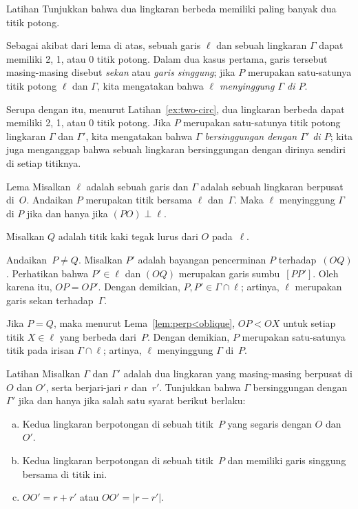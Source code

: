 \begin{thm}[!]{Latihan}\label{ex:two-circ}
Tunjukkan bahwa dua lingkaran berbeda memiliki paling banyak dua titik potong.
\end{thm}

Sebagai akibat dari lema di atas,
sebuah garis $\ell$ dan sebuah lingkaran $\Gamma$ dapat memiliki 2, 1, atau 0 titik potong.
Dalam dua kasus pertama, garis tersebut masing-masing disebut \emph{sekan} atau \emph{garis singgung};
jika $P$ merupakan satu-satunya titik potong $\ell$ dan $\Gamma$,
kita mengatakan bahwa \textit{$\ell$ menyinggung $\Gamma$ di $P$}.

Serupa dengan itu, menurut Latihan~\ref{ex:two-circ},
dua lingkaran berbeda dapat memiliki 2, 1, atau 0 titik potong.
Jika $P$ merupakan satu-satunya titik potong lingkaran $\Gamma$ dan $\Gamma'$,
kita mengatakan bahwa \emph{$\Gamma$ bersinggungan dengan $\Gamma'$ di $P$}; kita juga menganggap bahwa sebuah lingkaran bersinggungan dengan dirinya sendiri di setiap titiknya.

\begin{thm}[\abs]{Lema}\label{lem:tangent}
Misalkan $\ell$ adalah sebuah garis dan $\Gamma$ adalah sebuah lingkaran berpusat di~$O$.
Andaikan $P$ merupakan titik bersama $\ell$ dan~$\Gamma$.
Maka $\ell$ menyinggung $\Gamma$ di $P$ jika dan hanya jika $(PO)\perp \ell$.
\end{thm}

Misalkan $Q$ adalah titik kaki tegak lurus dari $O$ pada~$\ell$.

Andaikan~$P\ne Q$.
Misalkan $P'$ adalah bayangan pencerminan $P$ terhadap~$(OQ)$.
Perhatikan bahwa $P'\in\ell$ dan $(OQ)$ merupakan garis sumbu~$[PP']$.
Oleh karena itu, $OP=OP'$.
Dengan demikian, $P,P'\in \Gamma\cap \ell$;
artinya, $\ell$ merupakan garis sekan terhadap~$\Gamma$.

Jika $P=Q$,
maka menurut Lema~\ref{lem:perp<oblique},
$OP<OX$ untuk setiap titik $X\in \ell$ yang berbeda dari~$P$.
Dengan demikian, $P$ merupakan satu-satunya titik pada irisan $\Gamma\cap\ell$;
artinya, $\ell$ menyinggung $\Gamma$ di~$P$.
\qeds

\begin{thm}{Latihan}\label{ex:tangent-circles}
Misalkan $\Gamma$ dan $\Gamma'$ adalah dua lingkaran yang masing-masing berpusat di $O$ dan $O'$, serta berjari-jari $r$ dan~$r'$.
Tunjukkan bahwa $\Gamma$ bersinggungan dengan $\Gamma'$ jika dan hanya jika salah satu syarat berikut berlaku:
\begin{enumerate}[(a)]
\item\label{ex:tangent-circles:a} Kedua lingkaran berpotongan di sebuah titik~$P$ yang segaris dengan $O$ dan~$O'$.
\item\label{ex:tangent-circles:b} Kedua lingkaran berpotongan di sebuah titik~$P$ dan memiliki garis singgung bersama di titik ini.
\item\label{ex:tangent-circles-2} $OO' = r + r'$ atau $OO' = |r - r'|$.
\end{enumerate}

\end{thm}


